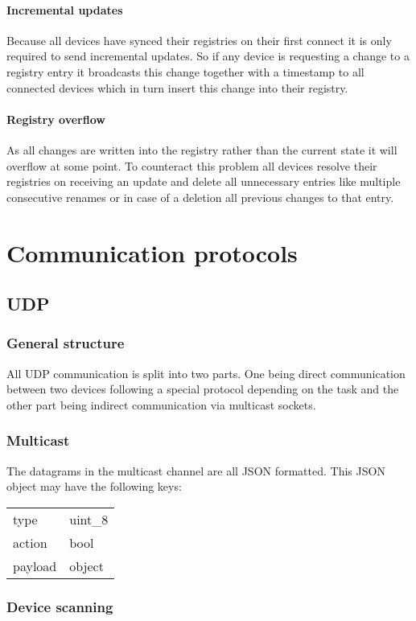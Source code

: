 \documentclass[a4paper]{article}
\begin{document}
        \paragraph{Incremental updates}  Because all devices have synced their registries on their first connect it is
            only required to send incremental updates. So if any device is requesting a change to a registry entry it
            broadcasts this change together with a timestamp to all connected devices which in turn insert this change
            into their registry.
        \paragraph{Registry overflow} As all changes are written into the registry rather than the current state it will
            overflow at some point. To counteract this problem all devices resolve their registries on receiving an
            update and delete all unnecessary entries like multiple consecutive renames or in case of a deletion all
            previous changes to that entry.
    \section{Communication protocols}
        \subsection{UDP}
	        \subsubsection{General structure}
		        All UDP communication is split into two parts. One being direct communication between two devices
		        following a special protocol depending on the task and the other part being indirect communication via
		        multicast sockets.
		    \subsubsection{Multicast}
			    The datagrams in the multicast channel are all JSON formatted. This JSON object may have the following
			    keys:\\
			    \begin{tabular}{l | l}
			    	type & uint\_8\\
			    	action & bool\\
			    	payload & object
			    \end{tabular}
	        \subsubsection{Device scanning}
\end{document}
